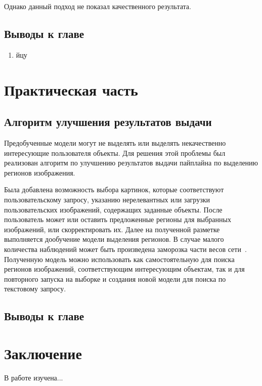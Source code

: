 \documentclass[a4paper,14pt]{article}
\begin{document}
    Однако данный подход не показал качественного результата.
       
    \subsection{Выводы к главе \thesection}
    \begin{enumerate}
        [1)]
        \itemsep0em
        \item йцу
    \end{enumerate}

    \newpage


    \section{Практическая часть}

    \subsection{Алгоритм улучшения результатов выдачи}
    
    Предобученные модели могут не выделять или выделять некачественно интересующие пользователя объекты.
    Для решения этой проблемы был реализован алгоритм по улучшению результатов выдачи пайплайна по выделению регионов изображения.
    
    Была добавлена возможность выбора картинок, которые соответствуют пользовательскому запросу, указанию нерелевантных или загрузки пользовательских изображений, содержащих заданные объекты.
    После пользователь может или оставить предложенные регионы для выбранных изображений, или скорректировать их.
    Далее на полученной разметке выполняется дообучение модели выделения регионов.
    В случае малого количества наблюдений может быть произведена заморозка части весов сети~\cite{wang2020few}.
    Полученную модель можно использовать как самостоятельную для поиска регионов изображений, соответствующим интересующим объектам, так и для повторного запуска на выборке и создания новой модели для поиска по текстовому запросу.
    

    \subsection{Выводы к главе \thesection}



    \newpage


    \section{Заключение}

    В работе изучена...

    \newpage
    \renewcommand{\refname}{{\normalsize \hfill Список использованных источников \hfill}}
%    
    
    
    \newpage
\end{document}
